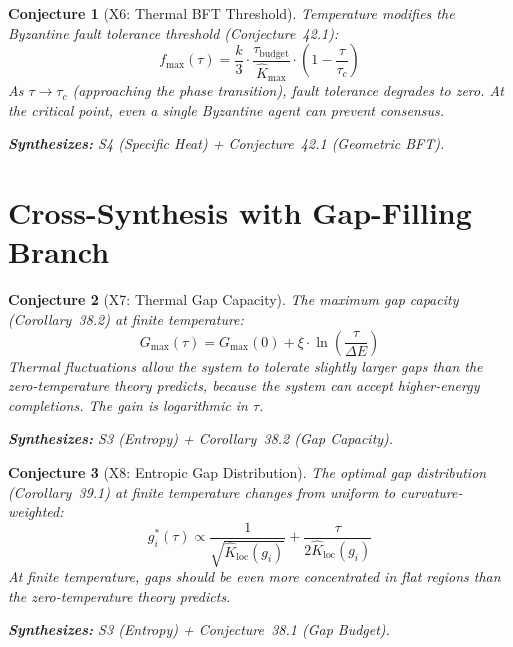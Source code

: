 \documentclass[11pt,letterpaper]{article}
\newtheorem{conjecture}{Conjecture}[section]
\newcommand{\Khat}{\hat{K}}
\newcommand{\tbudget}{\tau_{\mathrm{budget}}}
\begin{document}
\begin{conjecture}[X6: Thermal BFT 
Threshold]\label{conj:x_bft}
Temperature modifies the Byzantine fault tolerance threshold 
(Conjecture~42.1):
\begin{equation}
    f_{\max}(\tau) = \frac{k}{3} \cdot 
    \frac{\tbudget}{\Khat_{\max}} \cdot 
    \left(1 - \frac{\tau}{\tau_c}\right)
\end{equation}
As $\tau \to \tau_c$ (approaching the phase transition), fault tolerance 
degrades to zero. At the critical point, even a single Byzantine agent can 
prevent consensus.

\textbf{Synthesizes:} S4 (Specific Heat) + Conjecture~42.1 
(Geometric BFT).
\end{conjecture}

\section{Cross-Synthesis with Gap-Filling Branch}

\begin{conjecture}[X7: Thermal Gap 
Capacity]\label{conj:x_gap}
The maximum gap capacity (Corollary~38.2) at finite temperature:
\begin{equation}
    G_{\max}(\tau) = G_{\max}(0) + \xi \cdot \ln\left(
    \frac{\tau}{\Delta E}\right)
\end{equation}
Thermal fluctuations allow the system to tolerate slightly larger gaps 
than the zero-temperature theory predicts, because the system can accept 
higher-energy completions. The gain is logarithmic in $\tau$.

\textbf{Synthesizes:} S3 (Entropy) + Corollary~38.2 (Gap Capacity).
\end{conjecture}

\begin{conjecture}[X8: Entropic Gap 
Distribution]\label{conj:x_gap_dist}
The optimal gap distribution (Corollary~39.1) at finite temperature 
changes from uniform to curvature-weighted:
\begin{equation}
    g_i^*(\tau) \propto \frac{1}{\sqrt{\Khat_{\mathrm{loc}}(g_i)}} 
    + \frac{\tau}{2\Khat_{\mathrm{loc}}(g_i)}
\end{equation}
At finite temperature, gaps should be even more concentrated in flat 
regions than the zero-temperature theory predicts.

\textbf{Synthesizes:} S3 (Entropy) + Conjecture~38.1 (Gap Budget).
\end{conjecture}
\end{document}
